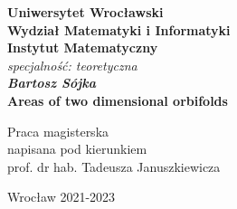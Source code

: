 \newpage
\thispagestyle{empty}
\begin{center}
\textbf{\large Uniwersytet Wrocławski\\
Wydział Matematyki i Informatyki\\
Instytut Matematyczny}\\
\textit{\large specjalność: teoretyczna}\\
\vspace{4cm}
\textbf{\textit{\large Bartosz Sójka}\\
\vspace{0.5cm}
{\Large Areas of two dimensional orbifolds}}\\
\end{center}
\vspace{3cm}
{\large \hspace*{6.5cm}Praca magisterska\\
\hspace*{6.5cm}napisana pod kierunkiem\\
\hspace*{6.5cm}prof. dr hab. Tadeusza Januszkiewicza }\\
\vfill
\begin{center}
{\large Wrocław 2021-2023}\\
\end{center}

